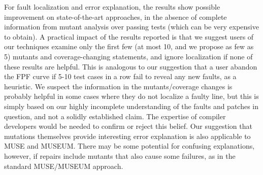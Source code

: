 For fault localization and error explanation, the results show possible improvement on state-of-the-art approaches, in the absence of complete information from mutant analysis over passing tests (which can be very expensive to obtain).  A practical impact of the results reported is that we suggest users of our techniques examine only the first few (at most 10, and we propose as few as 5) mutants and coverage-changing statements, and ignore localization if none of these results are helpful.  This is analogous to our suggestion that a user abandon the FPF curve if 5-10 test cases in a row fail to reveal any new faults, as a heuristic.  We suspect the information in the mutants/coverage changes is probably helpful in some cases where they do not localize a faulty line, but this is simply based on our highly incomplete understanding of the faults and patches in question, and not a solidly established claim.  The expertise of compiler developers would be needed to confirm or reject this belief.  Our suggestion that mutations themselves provide interesting error explanation is also applicable to MUSE and MUSEUM.  There may be some potential for confusing explanations, however, if repairs include mutants that also cause some failures, as in the standard MUSE/MUSEUM approach.

